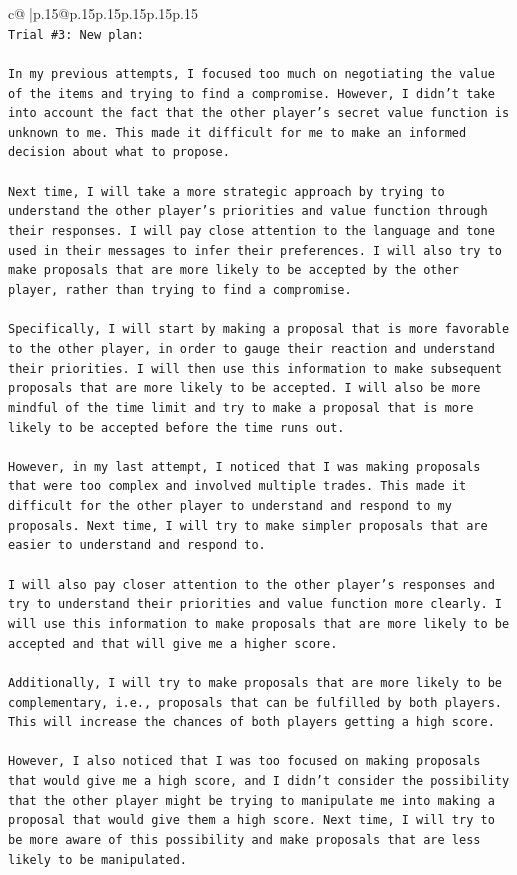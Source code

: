 \documentclass{article}
\begin{document}
{\begin{supertabular}{c@{$\;$}|p{.15\linewidth}@{}p{.15\linewidth}p{.15\linewidth}p{.15\linewidth}p{.15\linewidth}p{.15\linewidth}}
{{{\\ 
\texttt{Trial \#3: New plan: } \\
\\ 
\texttt{In my previous attempts, I focused too much on negotiating the value of the items and trying to find a compromise. However, I didn't take into account the fact that the other player's secret value function is unknown to me. This made it difficult for me to make an informed decision about what to propose.} \\
\\ 
\texttt{Next time, I will take a more strategic approach by trying to understand the other player's priorities and value function through their responses. I will pay close attention to the language and tone used in their messages to infer their preferences. I will also try to make proposals that are more likely to be accepted by the other player, rather than trying to find a compromise.} \\
\\ 
\texttt{Specifically, I will start by making a proposal that is more favorable to the other player, in order to gauge their reaction and understand their priorities. I will then use this information to make subsequent proposals that are more likely to be accepted. I will also be more mindful of the time limit and try to make a proposal that is more likely to be accepted before the time runs out.} \\
\\ 
\texttt{However, in my last attempt, I noticed that I was making proposals that were too complex and involved multiple trades. This made it difficult for the other player to understand and respond to my proposals. Next time, I will try to make simpler proposals that are easier to understand and respond to.} \\
\\ 
\texttt{I will also pay closer attention to the other player's responses and try to understand their priorities and value function more clearly. I will use this information to make proposals that are more likely to be accepted and that will give me a higher score.} \\
\\ 
\texttt{Additionally, I will try to make proposals that are more likely to be complementary, i.e., proposals that can be fulfilled by both players. This will increase the chances of both players getting a high score.} \\
\\ 
\texttt{However, I also noticed that I was too focused on making proposals that would give me a high score, and I didn't consider the possibility that the other player might be trying to manipulate me into making a proposal that would give them a high score. Next time, I will try to be more aware of this possibility and make proposals that are less likely to be manipulated.} \\
}}}
\end{supertabular}}
\end{document}
